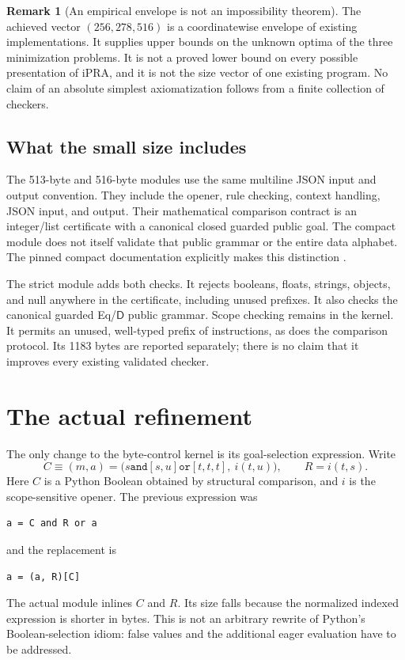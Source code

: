 \documentclass[11pt,letterpaper]{article}
\theoremstyle{definition}
\newtheorem{remark}[theorem]{Remark}
\newcommand{\D}{\mathsf D}
\newcommand{\ipra}{\mathrm{iPRA}}
\newcommand{\file}[1]{\texttt{\detokenize{#1}}}
\begin{document}
\begin{remark}[An empirical envelope is not an impossibility theorem]
The achieved vector $(256,278,516)$ is a coordinatewise envelope of existing
implementations. It supplies upper bounds on the unknown optima of the three
minimization problems. It is not a proved lower bound on every possible
presentation of $\ipra$, and it is not the size vector of one existing
program. No claim of an absolute simplest axiomatization follows from a
finite collection of checkers.
\end{remark}

\subsection{What the small size includes}
The 513-byte and 516-byte modules use the same multiline JSON input and
\file{ACCEPT\string\n} output convention. They include the opener, rule
checking, context handling, JSON input, and output. Their mathematical
comparison contract is an integer/list certificate with a canonical closed
guarded public goal. The compact module does not itself validate that public
grammar or the entire data alphabet. The pinned compact documentation
explicitly makes this distinction \cite{compact}.

The strict module adds both checks. It rejects booleans, floats, strings,
objects, and null anywhere in the certificate, including unused prefixes.
It also checks the canonical guarded Eq/$\D$ public grammar. Scope checking
remains in the kernel. It permits an unused, well-typed prefix of instructions,
as does the comparison protocol. Its 1183 bytes are reported separately;
there is no claim that it improves every existing validated checker.

\section{The actual refinement}
The only change to the byte-control kernel is its goal-selection expression.
Write
\[
 C\equiv
 (m,a)=\bigl(s\mathbin{\texttt{and}}[s,u]
                   \mathbin{\texttt{or}}[t,t,t],\ i(t,u)\bigr),
 \qquad R=i(t,s).
\]
Here $C$ is a Python Boolean obtained by structural comparison, and $i$ is
the scope-sensitive opener. The previous expression was
\begin{lstlisting}
a = C and R or a
\end{lstlisting}
and the replacement is
\begin{lstlisting}
a = (a, R)[C]
\end{lstlisting}
The actual module inlines $C$ and $R$. Its size falls because the normalized
indexed expression is shorter in bytes. This is not an arbitrary rewrite of
Python's Boolean-selection idiom: false values and the additional eager
evaluation have to be addressed.
\end{document}

